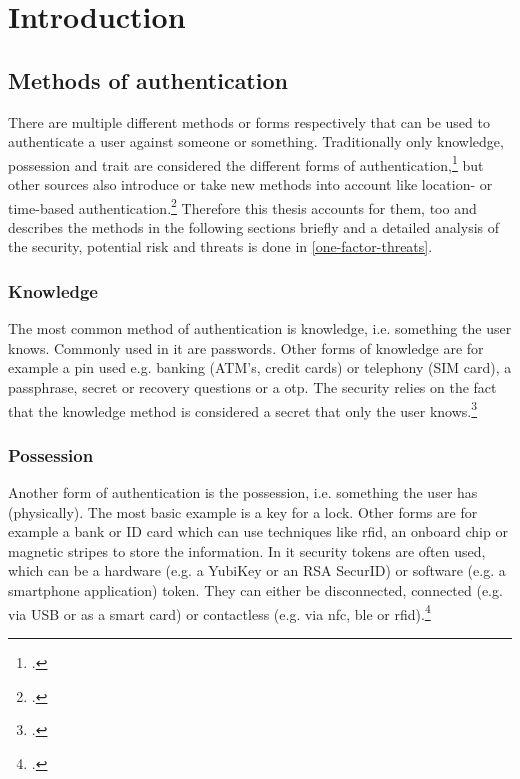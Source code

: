 \chapter{Introduction}

\blindtext

\section{Methods of authentication}
There are multiple different methods or forms respectively that can be used to authenticate a user against someone or something. Traditionally only knowledge, possession and trait are considered the different forms of authentication,\footcites[See][299]{10.2307/27845364}[See][140]{brotherston2017defensive}[][47]{anderson2008security} but other sources also introduce or take new methods into account like location- or time-based authentication.\footcites[][]{6296127}[See][191]{dasgupta2017multi} Therefore this thesis accounts for them, too and describes the methods in the following sections briefly and a detailed analysis of the security, potential risk and threats is done in \autoref{one-factor-threats}.

\subsection{Knowledge}

The most common method of authentication is knowledge, i.e. \frqq something the user knows\flqq{}. Commonly used in \gls{it} are passwords. Other forms of knowledge are for example a \gls{pin} used e.g. banking (ATM's, credit cards) or telephony (SIM card), a passphrase, secret or recovery questions or a \gls{otp}. The security relies on the fact that the knowledge method is considered a secret that only the user knows.\footcite[See][467]{eckert-it-sec-9}

\subsection{Possession}

Another form of authentication is the possession, i.e. \frqq something the user has\flqq{} (physically). The most basic example is a key for a lock. Other forms are for example a bank or ID card which can use techniques like \gls{rfid}, an onboard chip or magnetic stripes to store the information. In \gls{it} security tokens are often used, which can be a hardware (e.g. a YubiKey or an RSA SecurID) or software (e.g. a smartphone application) token. They can either be disconnected, connected (e.g. via USB or as a smart card) or contactless (e.g. via \gls{nfc}, \gls{ble} or \gls{rfid}).\footcites[See][24]{265831}[][]{Dressel:2019:SZT:3319499.3328225}[See][8--11]{1698485}

